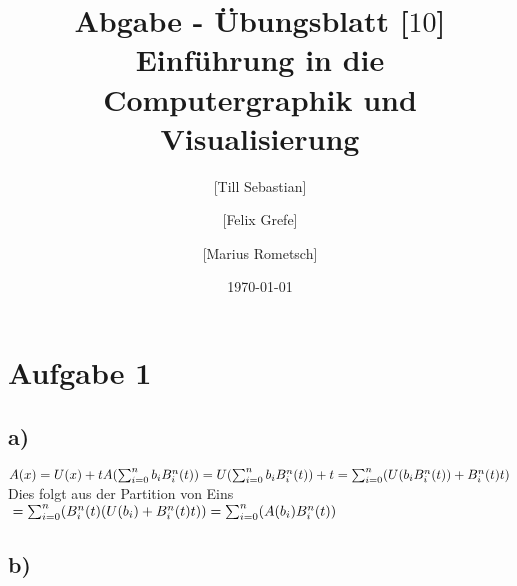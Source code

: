 \documentclass[10pt,a4paper]{article}
\begin{document}
\title{Abgabe - Übungsblatt [$10$]\\
\small{Einführung in die Computergraphik und Visualisierung}}
\author{ [Till Sebastian] \and [Felix Grefe] \and [Marius Rometsch]}
\date{\today}
\maketitle



\section*{Aufgabe 1}
\subsection*{a)}
$A(x)=U(x)+t
\\A(\sum_{i=0}^{n}b_i B^n _i(t))
\\=U(\sum_{i=0}^{n}b_i B^n _i(t))+t
\\=\sum_{i=0}^{n}(U (b_i B^n _i(t))+B^n _i(t)t)$ Dies folgt aus der Partition von Eins
$
\\=\sum_{i=0}^{n}(B^n _i(t)(U (b_i)+B^n _i(t)t))
\\=\sum_{i=0}^{n}(A(b_i) B^n _i(t))
$


\subsection*{b)}
\end{document}
